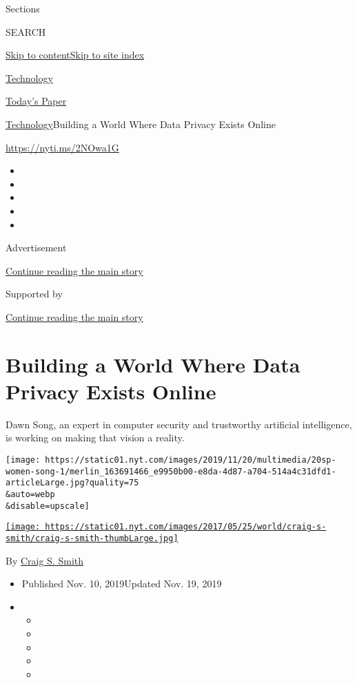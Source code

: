 Sections

SEARCH

\protect\hyperlink{site-content}{Skip to
content}\protect\hyperlink{site-index}{Skip to site index}

\href{https://www.nytimes.com/section/technology}{Technology}

\href{https://myaccount.nytimes.com/auth/login?response_type=cookie\&client_id=vi}{}

\href{https://www.nytimes.com/section/todayspaper}{Today's Paper}

\href{/section/technology}{Technology}\textbar{}Building a World Where
Data Privacy Exists Online

\url{https://nyti.ms/2NOwa1G}

\begin{itemize}
\item
\item
\item
\item
\item
\end{itemize}

Advertisement

\protect\hyperlink{after-top}{Continue reading the main story}

Supported by

\protect\hyperlink{after-sponsor}{Continue reading the main story}

\hypertarget{building-a-world-where-data-privacy-exists-online}{%
\section{Building a World Where Data Privacy Exists
Online}\label{building-a-world-where-data-privacy-exists-online}}

Dawn Song, an expert in computer security and trustworthy artificial
intelligence, is working on making that vision a reality.

\texttt{[image: https://static01.nyt.com/images/2019/11/20/multimedia/20sp-women-song-1/merlin\_163691466\_e9950b00-e8da-4d87-a704-514a4c31dfd1-articleLarge.jpg?quality=75\\\&auto=webp\\\&disable=upscale]}

\href{https://www.nytimes.com/by/craig-s-smith}{\texttt{[image: https://static01.nyt.com/images/2017/05/25/world/craig-s-smith/craig-s-smith-thumbLarge.jpg]}}

By \href{https://www.nytimes.com/by/craig-s-smith}{Craig S. Smith}

\begin{itemize}
\item
  Published Nov. 10, 2019Updated Nov. 19, 2019
\item
  \begin{itemize}
  \item
  \item
  \item
  \item
  \item
  \end{itemize}
\end{itemize}

